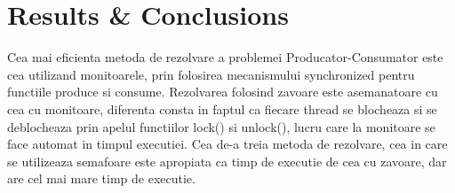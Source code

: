 \documentclass{article}
\begin{document}
\section{Results \& Conclusions}
\hspace{0.5 cm}
Cea mai eficienta metoda de rezolvare a problemei Producator-Consumator este cea utilizand monitoarele, prin folosirea mecanismului synchronized pentru functiile produce si consume. Rezolvarea folosind zavoare este asemanatoare cu cea cu monitoare, diferenta consta in faptul ca fiecare thread se blocheaza si se deblocheaza prin apelul functiilor lock() si unlock(), lucru care la monitoare se face automat in timpul executiei. Cea de-a treia metoda de rezolvare, cea in care se utilizeaza semafoare este apropiata ca timp de executie de cea cu zavoare, dar are cel mai mare timp de executie.
\end{document}
